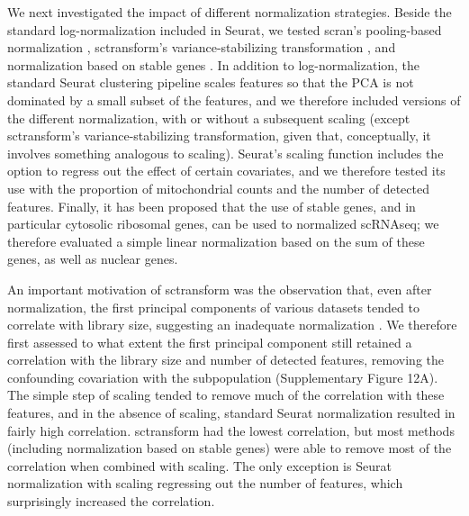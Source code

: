 \documentclass{bmcart}
\begin{document}
We next investigated the impact of different normalization strategies. Beside the standard log-normalization included in Seurat, we tested scran's pooling-based normalization \citep{lunPooling2016}, sctransform's variance-stabilizing transformation \citep{hafemeisterSCtransform2019}, and normalization based on stable genes \citep{linStableGenes2018, deekeStablyExpressed2018}. 
In addition to log-normalization, the standard Seurat clustering pipeline scales features so that the PCA is not dominated by a small subset of the features, and we therefore included versions of the different normalization, with or without a subsequent scaling (except sctransform's variance-stabilizing transformation, given that, conceptually, it involves something analogous to scaling). 
Seurat's scaling function includes the option to regress out the effect of certain covariates, and we therefore tested its use with the proportion of mitochondrial counts and the number of detected features. Finally, it has been proposed that the use of stable genes, and in particular cytosolic ribosomal genes, can be used to normalized scRNAseq; we therefore evaluated a simple linear normalization based on the sum of these genes, as well as nuclear genes.

An important motivation of sctransform was the observation that, even after normalization, the first principal components of various datasets tended to correlate with library size, suggesting an inadequate normalization \citep{hafemeisterSCtransform2019}. We therefore first assessed to what extent the first principal component still retained a correlation with the library size and number of detected features, removing the confounding covariation with the subpopulation (Supplementary Figure 12A). The simple step of scaling tended to remove much of the correlation with these features, and in the absence of scaling, standard Seurat normalization resulted in fairly high correlation. sctransform had the lowest correlation, but most methods (including normalization based on stable genes) were able to remove most of the correlation when combined with scaling. The only exception is Seurat normalization with scaling regressing out the number of features, which surprisingly increased the correlation.
\end{document}
